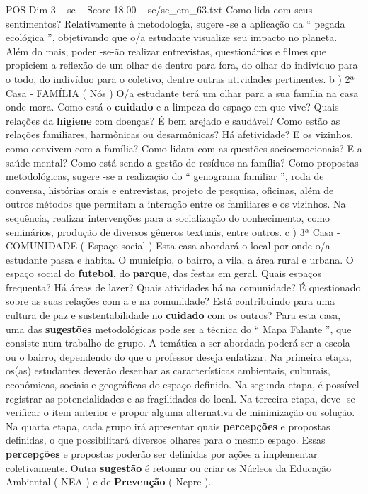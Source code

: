 \begin{textsample}{POS Dim 3 – sc – Score 18.00 – sc/sc\_em\_63.txt}
Como lida com seus sentimentos?
Relativamente à metodologia, sugere -se a aplicação da “ pegada ecológica ”, objetivando que o/a estudante visualize seu impacto no planeta.
Além do mais, poder -se-ão realizar entrevistas, questionários e filmes que propiciem a reflexão de um olhar de dentro para fora, do olhar do indivíduo para o todo, do indivíduo para o coletivo, dentre outras atividades pertinentes. b ) 2ª Casa - FAMÍLIA ( Nós ) O/a estudante terá um olhar para a sua família na casa onde mora.
Como está o \textbf{cuidado} e a limpeza do espaço em que vive?
Quais relações da \textbf{higiene} com doenças?
É bem arejado e saudável?
Como estão as relações familiares, harmônicas ou desarmônicas?
Há afetividade?
E os vizinhos, como convivem com a família?
Como lidam com as questões socioemocionais?
E a saúde mental?
Como está sendo a gestão de resíduos na família?
Como propostas metodológicas, sugere -se a realização do “ genograma familiar ”, roda de conversa, histórias orais e entrevistas, projeto de pesquisa, oficinas, além de outros métodos que permitam a interação entre os familiares e os vizinhos.
Na sequência, realizar intervenções para a socialização do conhecimento, como seminários, produção de diversos gêneros textuais, entre outros. c ) 3ª Casa - COMUNIDADE ( Espaço social ) Esta casa abordará o local por onde o/a estudante passa e habita.
O município, o bairro, a vila, a área rural e urbana.
O espaço social do \textbf{futebol}, do \textbf{parque}, das festas em geral.
Quais espaços frequenta?
Há áreas de lazer?
Quais atividades há na comunidade?
É questionado sobre as suas relações com a e na comunidade?
Está contribuindo para uma cultura de paz e sustentabilidade no \textbf{cuidado} com os outros?
Para esta casa, uma das \textbf{sugestões} metodológicas pode ser a técnica do “ Mapa Falante ”, que consiste num trabalho de grupo.
A temática a ser abordada poderá ser a escola ou o bairro, dependendo do que o professor deseja enfatizar.
Na primeira etapa, os(as) estudantes deverão desenhar as características ambientais, culturais, econômicas, sociais e geográficas do espaço definido.
Na segunda etapa, é possível registrar as potencialidades e as fragilidades do local.
Na terceira etapa, deve -se verificar o item anterior e propor alguma alternativa de minimização ou solução.
Na quarta etapa, cada grupo irá apresentar quais \textbf{percepções} e propostas definidas, o que possibilitará diversos olhares para o mesmo espaço.
Essas \textbf{percepções} e propostas poderão ser definidas por ações a implementar coletivamente.
Outra \textbf{sugestão} é retomar ou criar os Núcleos da Educação Ambiental ( NEA ) e de \textbf{Prevenção} ( Nepre ).

\end{textsample}

